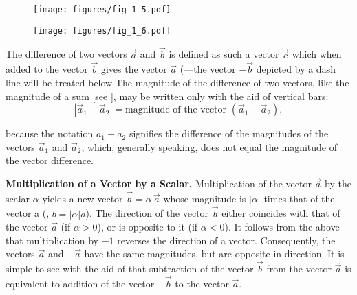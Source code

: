 \begin{figure}[t]
	\begin{minipage}[t]{0.5\linewidth}
		\begin{center}
			\texttt{[image: figures/fig\_1\_5.pdf]}
			\caption[]{}
			\label{fig:1_5}
		\end{center}
	\end{minipage}
	\hfill{ }%
	\begin{minipage}[t]{0.5\linewidth}
		\begin{center}
			\texttt{[image: figures/fig\_1\_6.pdf]}
			\caption[]{}
			\label{fig:1_6}
		\end{center}
	\end{minipage}
\vspace{-0.7cm}
\end{figure}

The difference of two vectors $\vec{a}$ and $\vec{b}$ is defined as such a vector $\vec{c}$ which when added to the vector $\vec{b}$ gives the vector $\vec{a}$ (---the vector $-\vec{b}$ depicted by a dash line will be treated below The magnitude of the difference of two vectors, like the magnitude of a sum [see ], may be written only with the aid of vertical bars:
\begin{equation}\label{eq:1_2}
|\vec{a}_1 - \vec{a}_2| = \text{magnitude of the vector } (\vec{a}_1 - \vec{a}_2),
\end{equation}

\noindent
because the notation $a_1-a_2$ signifies the difference of the magnitudes of the vectors $\vec{a}_1$ and $\vec{a}_2$, which, generally speaking, does not equal the magnitude of the vector difference.

\textbf{Multiplication of a Vector by a Scalar.} Multiplication of the vector $\vec{a}$ by the scalar $\alpha$ yields a new vector $\vec{b}=\alpha\,\vec{a}$ whose magnitude is $|\alpha|$ times that of the vector a (\ie, $b=|\alpha|a$). The direction of the vector $\vec{b}$ either coincides with that of the vector $\vec{a}$ (if $\alpha>0$), or is opposite to it (if $\alpha<0$). It follows from the above that multiplication by $-1$ reverses the direction of a vector. Consequently, the vectors $\vec{a}$ and $-\vec{a}$ have the same magnitudes, but are opposite in direction. It is simple to see with the aid of   that subtraction of the vector $\vec{b}$ from the vector $\vec{a}$ is equivalent to addition of the vector $-\vec{b}$ to the vector $\vec{a}$.

